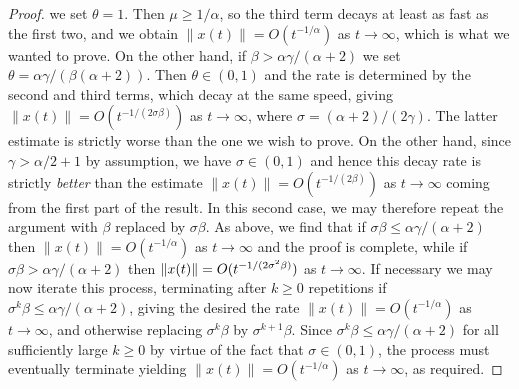 \documentclass[10pt,a4paper]{amsart}
\begin{document}
\begin{proof}
we set $\theta=1$. Then $\mu\ge1/\alpha$, so the third term decays at least as fast as the first two, and we obtain $\|x(t)\|=O(t^{-1/\alpha})$ as $t\to\infty$, which is what we wanted to prove. On the other hand, if $\beta> \alpha\gamma/(\alpha+2)$ we set $\theta=\alpha\gamma/(\beta(\alpha+2))$. Then $\theta\in(0,1)$ and the rate is determined by the second and third terms, which decay at the same speed, giving $\|x(t)\|=O(t^{-1/(2\sigma\beta)})$ as $t\to\infty$, where $\sigma=(\alpha+2)/(2\gamma)$. The latter estimate is strictly worse than the one we wish to prove. On the other hand, since $\gamma>\alpha/2+1$ by assumption, we have $\sigma\in(0,1)$ and hence this decay rate is strictly \emph{better} than the estimate $\|x(t)\|=O(t^{-1/(2\beta)})$ as $t\to\infty$ coming from the first part of the result. In this second case, we may therefore repeat the argument with $\beta$ replaced by $\sigma\beta$. As above, we find that if $\sigma\beta\le \alpha\gamma/(\alpha+2)$ then $\|x(t)\|=O(t^{-1/\alpha})$ as $t\to\infty$ and the proof is complete, while if $\sigma\beta> \alpha\gamma/(\alpha+2)$ then  $\|x(t)\|=O\smash{(t^{-1/(2\sigma^2\beta)})}$ as $t\to\infty$. If necessary we may now iterate this process, terminating after $k\ge0$ repetitions if $\sigma^k\beta\le \alpha\gamma/(\alpha+2)$, giving the desired the rate $\|x(t)\|=O(t^{-1/\alpha})$ as $t\to\infty$, and otherwise replacing $\sigma^k\beta$ by $\sigma^{k+1}\beta$. Since $\sigma^k\beta\le \alpha\gamma/(\alpha+2)$ for all sufficiently large $k\ge0$ by virtue of the fact that $\sigma\in(0,1)$, the process must eventually terminate yielding $\|x(t)\|=O(t^{-1/\alpha})$ as $t\to\infty$, as required.
\end{proof}
\end{document}
